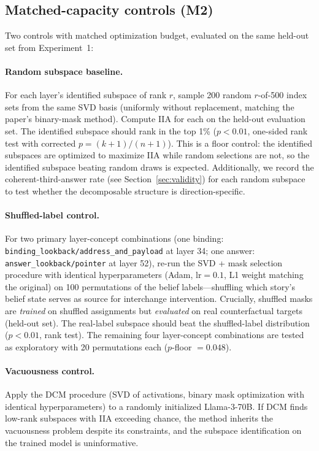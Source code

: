 \documentclass[11pt]{article}
\begin{document}
\subsection{Matched-capacity controls (M2)}

Two controls with matched optimization budget, evaluated on the same held-out set from Experiment~1:

\paragraph{Random subspace baseline.} For each layer's identified subspace of rank $r$, sample 200 random $r$-of-500 index sets from the same SVD basis (uniformly without replacement, matching the paper's binary-mask method). Compute IIA for each on the held-out evaluation set. The identified subspace should rank in the top 1\% ($p < 0.01$, one-sided rank test with corrected $p = (k + 1)/(n + 1)$). This is a floor control: the identified subspaces are optimized to maximize IIA while random selections are not, so the identified subspace beating random draws is expected. Additionally, we record the coherent-third-answer rate (see Section~\ref{sec:validity}) for each random subspace to test whether the decomposable structure is direction-specific.

\paragraph{Shuffled-label control.} For two primary layer-concept combinations (one binding: \texttt{binding\_lookback/address\_and\_payload} at layer 34; one answer: \texttt{answer\_lookback/pointer} at layer 52), re-run the SVD + mask selection procedure with identical hyperparameters (Adam, $\text{lr} = 0.1$, L1 weight matching the original) on 100 permutations of the belief labels---shuffling which story's belief state serves as source for interchange intervention. Crucially, shuffled masks are \emph{trained} on shuffled assignments but \emph{evaluated} on real counterfactual targets (held-out set). The real-label subspace should beat the shuffled-label distribution ($p < 0.01$, rank test). The remaining four layer-concept combinations are tested as exploratory with 20 permutations each ($p$-floor $= 0.048$).

\paragraph{Vacuousness control.} Apply the DCM procedure (SVD of activations, binary mask optimization with identical hyperparameters) to a randomly initialized Llama-3-70B. If DCM finds low-rank subspaces with IIA exceeding chance, the method inherits the \citet{sutter2025vacuous} vacuousness problem despite its constraints, and the subspace identification on the trained model is uninformative.
\end{document}
